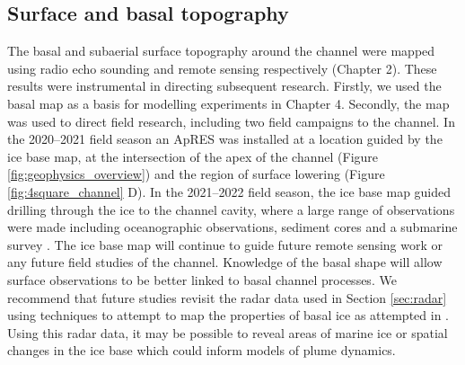 \subsection{Surface and basal topography}

The basal and subaerial surface topography around the channel were mapped using radio echo sounding and remote sensing respectively (Chapter 2).  
These results were instrumental in directing subsequent research. Firstly, we used the basal map as a basis for modelling experiments in Chapter 4. Secondly, the map was used to direct field research, including two field campaigns to the channel. In the 2020--2021 field season an ApRES was installed at a location guided by the ice base map, at the intersection of the apex of the channel (Figure \ref{fig:geophysics_overview}) and the region of surface lowering (Figure \ref{fig:4square_channel} D). In the 2021--2022 field season, the ice base map guided drilling through the ice to the channel cavity, where a large range of observations were made including oceanographic observations, sediment cores and a submarine survey \citep{horgan2022channel}. The ice base map will continue to guide future remote sensing work or any future field studies of the channel. Knowledge of the basal shape will allow surface observations to be better linked to basal channel processes. 
We recommend that future studies revisit the radar data used in Section \ref{sec:radar} using techniques to attempt to map the properties of basal ice as attempted in \cite{macgregor2011grounding}. Using this radar data, it may be possible to reveal areas of marine ice or spatial changes in the ice base which could inform models of plume dynamics.

